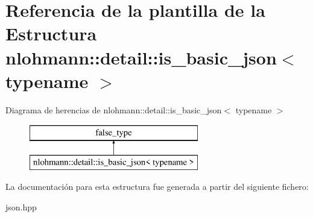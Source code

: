 \hypertarget{structnlohmann_1_1detail_1_1is__basic__json}{}\section{Referencia de la plantilla de la Estructura nlohmann\+:\+:detail\+:\+:is\+\_\+basic\+\_\+json$<$ typename $>$}
\label{structnlohmann_1_1detail_1_1is__basic__json}
Diagrama de herencias de nlohmann\+:\+:detail\+:\+:is\+\_\+basic\+\_\+json$<$ typename $>$\begin{figure}[H]
\begin{center}
\leavevmode
\includegraphics[height=2.000000cm]{structnlohmann_1_1detail_1_1is__basic__json}
\end{center}
\end{figure}


La documentación para esta estructura fue generada a partir del siguiente fichero\+:\begin{DoxyCompactItemize}
\item 
json.\+hpp\end{DoxyCompactItemize}
